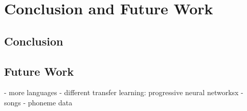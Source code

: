 \section{Conclusion and Future Work}
\label{sec:summary}

\subsection{Conclusion}
\subsection{Future Work}


- more languages
- different transfer learning: progressive neural networksx
- songs
- phoneme data
